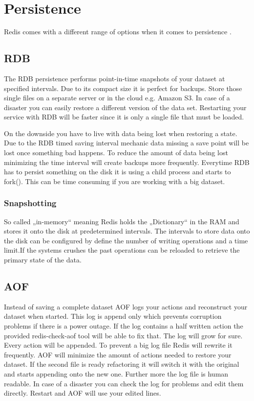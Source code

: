 \chapter{Persistence}
Redis comes with a different range of options when it comes to persistence \cite{redis_persistence}. 

\section{RDB}
The RDB persistence performs point-in-time snapshots of your dataset at specified intervals.
Due to its compact size it is perfect for backups. Store those single files on a separate server or in the cloud e.g. Amazon S3.
In case of a disaster you can easily restore a different version of the data set.
Restarting your service with RDB will be faster since it is only a single file that must be loaded.

On the downside you have to live with data being lost when restoring a state. Due to the RDB timed saving interval mechanic data missing a save point will be lost once something bad happens.
To reduce the amount of data being lost minimizing the time interval will create backups more frequently.
Everytime RDB has to persist something on the disk it is using a child process and starts to fork(). This can be time consuming if you are working with a big dataset.

\subsection{Snapshotting}
So called „in-memory“ meaning Redis holds the „Dictionary“ in the RAM and stores it onto the disk at predetermined intervals. The intervals to store data onto the disk can be configured by define the number of writing operations and a time limit.If the systems crushes the past operations can be reloaded to retrieve the primary state of the data.

\section{AOF}
Instead of saving a complete dataset AOF logs your actions and reconstruct your dataset when started.
This log is append only which prevents corruption problems if there is a power outage. If the log contains a half written action the provided redis-check-aof tool will be able to fix that.
The log will grow for sure. Every action will be appended. To prevent a big log file Redis will rewrite it frequently. AOF will minimize the amount of actions needed to restore your dataset. If the second file is ready refactoring it will switch it with the original and starts appending onto the new one.
Further more the log file is human readable. In case of a disaster you can check the log for problems and edit them directly. Restart and AOF will use your edited lines.

